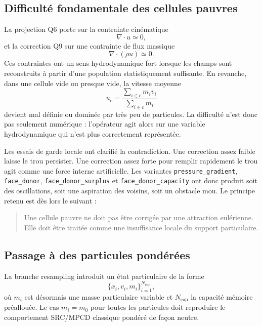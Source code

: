 \documentclass[11pt,a4paper]{article}
\begin{document}
\subsection{Difficulté fondamentale des cellules pauvres}

La projection Q6 porte sur la contrainte cinématique
\begin{equation}
  \nabla\cdot u \simeq 0,
\end{equation}
et la correction Q9 sur une contrainte de flux massique
\begin{equation}
  \nabla\cdot(\rho u) \simeq 0.
\end{equation}
Ces contraintes ont un sens hydrodynamique fort lorsque les champs sont reconstruits à partir d'une population statistiquement suffisante. En revanche, dans une cellule vide ou presque vide, la vitesse moyenne
\begin{equation}
  u_c = \frac{\sum_{i\in c} m_i v_i}{\sum_{i\in c} m_i}
\end{equation}
devient mal définie ou dominée par très peu de particules. La difficulté n'est donc pas seulement numérique : l'opérateur agit alors sur une variable hydrodynamique qui n'est plus correctement représentée.

Les essais de garde locale ont clarifié la contradiction. Une correction assez faible laisse le trou persister. Une correction assez forte pour remplir rapidement le trou agit comme une force interne artificielle. Les variantes \texttt{pressure\_gradient}, \texttt{face\_donor}, \texttt{face\_donor\_surplus} et \texttt{face\_donor\_capacity} ont donc produit soit des oscillations, soit une aspiration des voisins, soit un obstacle mou. Le principe retenu est dès lors le suivant :
\begin{quote}
Une cellule pauvre ne doit pas être corrigée par une attraction eulérienne. Elle doit être traitée comme une insuffisance locale du support particulaire.
\end{quote}

\subsection{Passage à des particules pondérées}

La branche resampling introduit un état particulaire de la forme
\begin{equation}
  \{x_i, v_i, m_i\}_{i=1}^{N_{\mathrm{cap}}},
\end{equation}
où $m_i$ est désormais une masse particulaire variable et $N_{\mathrm{cap}}$ la capacité mémoire préallouée. Le cas $m_i=m_0$ pour toutes les particules doit reproduire le comportement SRC/MPCD classique pondéré de façon neutre.
\end{document}
